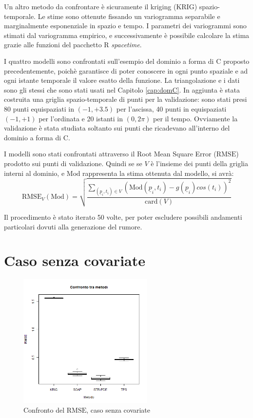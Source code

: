 \documentclass[a4paper,11pt,twoside,openright]{book}							%
\begin{document}
Un altro metodo da confrontare è sicuramente il kriging (KRIG) spazio-temporale. Le stime sono ottenute fissando un variogramma separabile e marginalmente esponenziale in spazio e tempo. I parametri dei variogrammi sono stimati dal variogramma empirico, e successivamente è possibile calcolare la stima grazie alle funzioni del pacchetto R \textit{spacetime}.

I quattro modelli sono confrontati sull'esempio del dominio a forma di C proposto precedentemente, poichè garantisce di poter conoscere in ogni punto spaziale e ad ogni istante temporale il valore esatto della funzione. La triangolazione e i dati sono gli stessi che sono stati usati nel Capitolo \ref{cap:domC}. In aggiunta è stata costruita una griglia spazio-temporale di punti per la validazione: sono stati presi 80 punti equispaziati in $(-1,+3.5)$ per l'ascissa, 40 punti in equispaziati $(-1,+1)$ per l'ordinata e 20 istanti in $(0,2\pi)$ per il tempo. Ovviamente la validazione è stata studiata soltanto sui punti che ricadevano all'interno del dominio a forma di C.

I modelli sono stati confrontati attraverso il Root Mean Square Error ($\mathrm{RMSE}$) prodotto sui punti di validazione. Quindi se se $V$ è l'insieme dei punti della griglia interni al dominio, e $\mathrm{Mod}$ rappresenta la stima ottenuta dal modello, si avrà:
$$
\mathrm{RMSE}_V(\mathrm{Mod})=\sqrt{\frac{\sum_{(\underline p_i,t_i)\in V} (\mathrm{Mod}(\underline p_i,t_i)-g(\underline p_i)cos(t_i))^2}{\mathrm{card}(V)}}
$$ 

Il procedimento è stato iterato 50 volte, per poter escludere possibili andamenti particolari dovuti alla generazione del rumore.
 
\section{Caso senza covariate}

\begin{figure}[t]
	\centering
	\includegraphics[width=0.60\textwidth]{Immagini/Confronto_metodi.png}   
	\caption{Confronto del $\mathrm{RMSE}$, caso senza covariate}
	\label{fig:cfr}
\end{figure}
\end{document}

